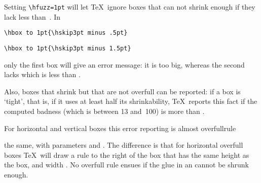 \documentclass{book}
\begin{document}
\begin{example} Setting \verb>\hfuzz=1pt> will let \TeX\ ignore
boxes that can not shrink enough if they lack less than~\n{1pt}.
In
\begin{verbatim}
\hbox to 1pt{\hskip3pt minus .5pt}
\end{verbatim}
\begin{verbatim}
\hbox to 1pt{\hskip3pt minus 1.5pt}
\end{verbatim}
only the first box will give an error message:
it is \n{1.5pt} too big, whereas the second lacks
\n{.5pt} which is less than .
\end{example}

Also, boxes that shrink but that are not overfull can be reported:
if a box is `tight', that is, if it uses at least half its
shrinkability, \TeX\ reports this fact if the
computed badness (which is between 13 and~100) is more than
.

For horizontal and vertical boxes this error reporting is almost
\cstoidx overfullrule\par
the same, with parameters  and .
The difference is that for horizontal overfull boxes
\TeX\ will draw a rule to the right of the box that has the
same height as the box, and width .
No overfull rule ensues if
the  glue in an  cannot be
shrunk enough.
\end{document}
